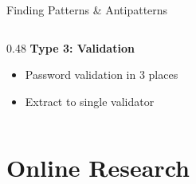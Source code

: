 \documentclass[aspectratio=169,11pt]{beamer}
\begin{document}
\begin{frame}[fragile]{Finding Patterns \& Antipatterns}
\begin{columns}[T]
\begin{column}{0.48\textwidth}
            \vspace{0.2cm}
            \textcolor{UofSCHoneycomb}{\faClone} \textbf{Type 3: Validation}
            \begin{itemize}
                \item Password validation in 3 places
                \item Extract to single validator
            \end{itemize}
        \end{column}
    \end{columns}

\end{frame}

\section{Online Research}
\end{document}
